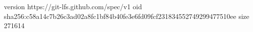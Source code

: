 version https://git-lfs.github.com/spec/v1
oid sha256:c58a14c7b26c3ad02a8fc1bf84b40fe3e6fd09fcf231834552749299477510ee
size 271614
